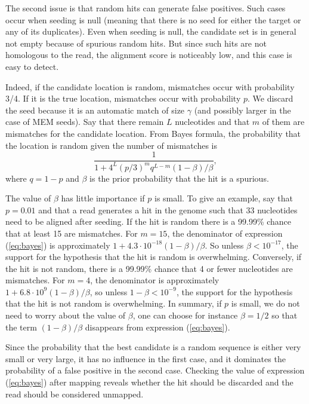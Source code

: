 \documentclass{article}
\begin{document}
The second issue is that random hits can generate false positives. Such
cases occur when seeding is null (meaning that there is no seed for either
the target or any of its duplicates). Even when seeding is null, the
candidate set is in general not empty because of spurious random hits. But
since such hits are not homologous to the read, the alignment score is
noticeably low, and this case is easy to detect.

Indeed, if the candidate location is random, mismatches occur with
probability 3/4. If it is the true location, mismatches occur with
probability $p$. We discard the seed because it is an automatic match of
size $\gamma$ (and possibly larger in the case of MEM seeds). Say that
there remain $L$ nucleotides and that $m$ of them are mismatches for the
candidate location. From Bayes formula, the probability that the location
is random given the number of mismatches is
\begin{equation}
\label{eq:bayes}
\frac{1}{1 + 4^L(p/3)^mq^{L-m}(1-\beta)/\beta},
\end{equation}
where $q=1-p$ and $\beta$ is the prior probability that the hit is
a spurious.

The value of $\beta$ has little importance if $p$ is small. To give an
example, say that $p=0.01$ and that a read generates a hit in the genome
such that 33 nucleotides need to be aligned after seeding. If the hit is
random there is a 99.99\% chance that at least 15 are mismatches. For
$m=15$, the denominator of expression (\ref{eq:bayes}) is approximately $1
+ 4.3\cdot10^{-18}(1-\beta)/\beta$. So unless $\beta < 10^{-17}$, the
support for the hypothesis that the hit is random is overwhelming.
Conversely, if the hit is not random, there is a 99.99\% chance that 4 or
fewer nucleotides are mismatches. For $m=4$, the denominator is
approximately $1+6.8\cdot10^9(1-\beta)/\beta$, so unless $1-\beta <
10^{-9}$, the support for the hypothesis that the hit is not random is
overwhelming. In summary, if $p$ is small, we do not need to worry about
the value of $\beta$, one can choose for instance $\beta=1/2$ so that the
term $(1-\beta)/\beta$ disappears from expression (\ref{eq:bayes}).

Since the probability that the best candidate is a random sequence is
either very small or very large, it has no influence in the first case,
and it dominates the probability of a false positive in the second case.
Checking the value of expression (\ref{eq:bayes}) after mapping reveals
whether the hit should be discarded and the read should be considered
unmapped.
\end{document}
